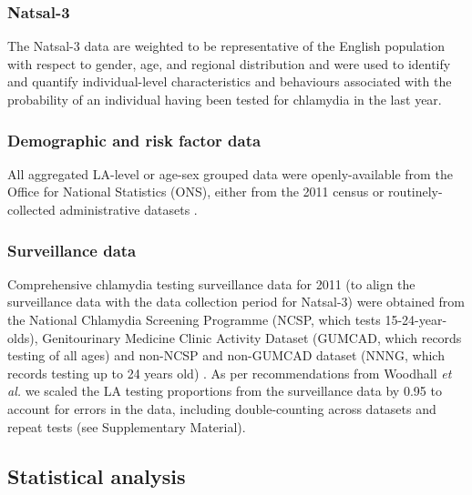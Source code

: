 \documentclass[12pt]{article}
\begin{document}
\subsubsection*{Natsal-3}
The Natsal-3 data are weighted to be representative of the English population with respect to gender, age, and regional distribution \cite{Mercer2013,Erens2013} and were used to identify and quantify individual-level characteristics and behaviours associated with the probability of an individual having been tested for chlamydia in the last year.

\subsubsection*{Demographic and risk factor data}
All aggregated LA-level or age-sex grouped data were openly-available from the Office for National Statistics (ONS), either from the 2011 census \cite{OfficeforNationalStatistics2011} or routinely-collected administrative datasets \cite{OfficeforNationalStatistics2011a,DepartmentforCommunitiesandLocalGovernment}.

\subsubsection*{Surveillance data}
Comprehensive chlamydia testing surveillance data for 2011 (to align the surveillance data with the data collection period for Natsal-3) were obtained from the National Chlamydia Screening Programme (NCSP, which tests 15-24-year-olds), Genitourinary Medicine Clinic Activity Dataset (GUMCAD, which records testing of all ages) and non-NCSP and non-GUMCAD dataset (NNNG, which records testing up to 24 years old) \cite{PublicHealthEngland}. As per recommendations from Woodhall {\it et al.} \cite{Woodhall2013} we scaled the LA testing proportions from the surveillance data by 0.95 to account for errors in the data, including double-counting across datasets and repeat tests (see Supplementary Material).

\subsection*{Statistical analysis}
\end{document}
